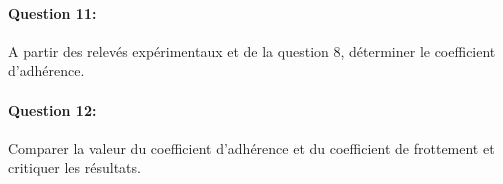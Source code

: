 
\paragraph{Question 11:} A partir des relevés expérimentaux et de la question 8, déterminer le coefficient d'adhérence.

\paragraph{Question 12:} Comparer la valeur du coefficient d'adhérence et du coefficient de frottement et critiquer les résultats.


